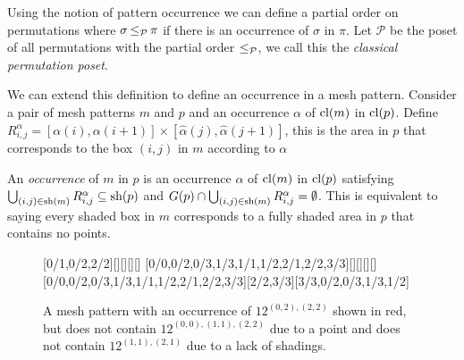 \documentclass[11pt,a4paper,oneside]{article}
\begin{document}
Using the notion of pattern occurrence we can define a partial order on
permutations where $\sigma\operatorname{\le_{\mathcal{P}}}\pi$ if there is an occurrence of $\sigma$ in
$\pi$. Let $\mathcal{P}$ be the poset of all permutations with the partial order
$\operatorname{\le_{\mathcal{P}}}$, we call this the \emph{classical permutation poset}.

We can extend this definition to define an occurrence in a mesh pattern.
Consider a pair of mesh patterns $m$ and $p$ and an occurrence $\alpha$ of
$\operatorname{\textrm{cl}}(m)$ in $\operatorname{\textrm{cl}}(p)$. Define
$R^\alpha_{i,j}=[\alpha(i),\alpha(i+1)]\times[\hat{\alpha}(j),\hat{\alpha}(j+1)]$,
this is the area in $p$ that corresponds to the box $(i,j)$ in $m$ according to
$\alpha$

An \emph{occurrence} of $m$ in $p$ is an occurrence $\alpha$ of $\operatorname{\textrm{cl}}(m)$ in
$\operatorname{\textrm{cl}}(p)$ satisfying $\bigcup_{(i,j)\in \operatorname{\textrm{sh}}(m)}R^\alpha_{i,j}\subseteq\operatorname{\textrm{sh}}(p)$ and
$G(p)\cap\bigcup_{(i,j)\in \operatorname{\textrm{sh}}(m)}R^\alpha_{i,j}=\emptyset$. This is equivalent
to saying every shaded box in $m$ corresponds to a fully shaded area in $p$
that contains no points.

\begin{figure}\centering
{}[0/1,0/2,2/2][][][][]
[0/0,0/2,0/3,1/3,1/1,1/2,2/1,2/2,3/3][][][][]
[0/0,0/2,0/3,1/3,1/1,1/2,2/1,2/2,3/3][2/2,3/3][3/3,0/2,0/3,1/3,1/2]
\caption{A mesh pattern with an occurrence of $12^{(0,2),(2,2)}$ shown in red,
 but does not contain $12^{(0,0),(1,1),(2,2)}$ due to a point and does not
 contain $12^{(1,1),(2,1)}$ due to a lack of shadings.}\label{fig:occEx}
\end{figure}
\end{document}
